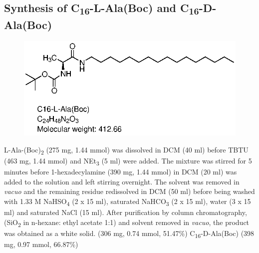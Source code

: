 \subsection*{Synthesis of C\textsubscript{16}-L-Ala(Boc) and C\textsubscript{16}-D-Ala(Boc)}
\begin{figure}[h!]
\centering
\includegraphics{Figures/C16-L-Ala_boc_.eps}
\end{figure}
L-Ala-(Boc)\textsubscript{2} (275 mg, 1.44 mmol) was dissolved in DCM (40 ml) before TBTU (463 mg, 1.44 mmol) and NEt\textsubscript{3} (5 ml) were added. 
The mixture was stirred for 5 minutes before 1-hexadecylamine (390 mg, 1.44 mmol) in DCM (20 ml) was added to the solution and left stirring overnight. 
The solvent was removed in \textit{vacuo} and the remaining residue redissolved in DCM (50 ml) before being washed with 1.33 M NaHSO\textsubscript{4} (2 x 15 ml), saturated NaHCO\textsubscript{3} (2 x 15 ml), water (3 x 15 ml) and saturated NaCl (15 ml). After purification by column chromatography, (SiO\textsubscript{2} in n-hexane: ethyl acetate 1:1) and solvent removed in \textit{vacuo}, the product was obtained as a white solid. (306 mg, 0.74 mmol, 51.47\%) C\textsubscript{16}-D-Ala(Boc) (398 mg, 0.97 mmol, 66.87\%)

